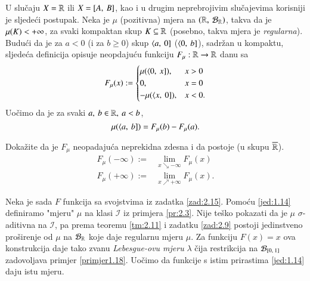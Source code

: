 U slu\v caju $X = \mathbb{R}$ ili $X = [{A}, \:{B}]$, kao i u drugim
neprebrojivim slu\v cajevima korisniji je sljede\' ci postupak.
Neka je $\mu$ (pozitivna) mjera na $(\mathbb{R}, \: \mathcal{B}_{\mathbb{R}})$, takva da je
$\mu({K}) < +\infty$, za svaki kompaktan skup $K \subseteq \mathbb{R}$
(posebno, takva mjera je \emph{regularna}). Budu\' ci da je za
$a < 0$ (i za $b \geq 0$) skup $\langle {a}, \: {0}]$ ($\langle {0}, \: {b}]$),
sadr\v zan u kompaktu, sljede\' ca definicija opisuje neopdaju\' cu
funkciju $F_{\mu}: \mathbb{R} \to \mathbb{R}$ danu sa
\begin{equation}    \label{jed:2.13}
    F_{\mu}(x) :=
        \begin{cases}
            \mu({\langle {0}, \: {x}]}), &x > 0\\
            0,   &x = 0\\
            - \mu({\langle {x}, \: {0}]}), &x < 0.
        \end{cases}
\end{equation}
Uo\v cimo da je za svaki $a, \: b \in \mathbb{R}, \: a < b$,
\begin{equation}    \label{jed:2.14}
    \mu({\langle {a}, \: {b}]}) = F_{\mu}(b) - F_{\mu}(a).
\end{equation}

\begin{zad} \label{zad:2.15}
    Doka\v zite da je $F_{\mu}$ neopadaju\' ca neprekidna zdesna i da
    postoje (u skupu $\overline{\mathbb{R}}$).
    \begin{align*}
        F_{\mu}(-\infty) :=& \lim_{x \searrow -\infty} F_{\mu}(x)\\
        F_{\mu}(+\infty) :=& \lim_{x \nearrow +\infty} F_{\mu}(x).
    \end{align*}
\end{zad}

Neka je sada $F$ funkcija sa svojstvima iz zadatka \ref{zad:2.15}.
Pomo\' cu \eqref{jed:1.14} definiramo "mjeru" $\mu$ na klasi
$\mathcal{I}$ iz primjera \eqref{pr:2.3}. Nije te\v sko pokazati
da je $\mu$ $\sigma$-aditivna na $\mathcal{I}$, pa prema teoremu
\ref{tm:2.11} i zadatku \ref{zad:2.9} postoji jedinstveno
pro\v sirenje od $\mu$ na $\mathcal{B}_{\mathbb{R}}$ koje daje regularnu mjeru
$\mu$. Za funkciju $F(x) = x$ ova konstrukcija daje tako zvanu
\emph{Lebesgue-ovu mjeru} $\lambda$ \v cija restrikcija na
$\mathcal{B}_{[{0}, \:{1}]}$ zadovoljava primjer \ref{primjer1.18}.
Uo\v cimo da funkcije s istim prirastima \eqref{jed:1.14}
daju istu mjeru.


